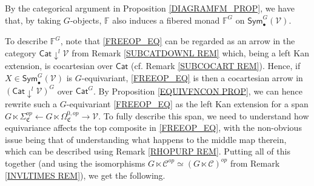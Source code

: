 \documentclass[a4paper,10pt
]{article}%
\numberwithin{equation}{section}
\numberwithin{figure}{section}
\theoremstyle{definition} %
\newcommand{\V}{\ensuremath{\mathcal V}}
\newcommand{\1}{\ensuremath{\mathbbm 1}}%
\begin{document}
By the categorical argument in 
Proposition \ref{DIAGRAMFM_PROP},
we have that, by taking $G$-objects, 
$\mathbb{F}$ also induces a fibered monad 
$\mathbb{F}^G$ on $\mathsf{Sym}^G_{\bullet}(\V)$.

To describe $\mathbb{F}^G$,
note that \eqref{FREEOP_EQ}
can be regarded as an arrow in 
the category $\mathsf{Cat} \downarrow^l \V$
from Remark \ref{SUBCATDOWNL REM}
which, being a left Kan extension, is cocartesian over $\mathsf{Cat}$ (cf. Remark \ref{SUBCOCART REM}).
Hence, if $X \in \mathsf{Sym}_{\bullet}^G(\V)$
is $G$-equivariant, 
\eqref{FREEOP_EQ} is then a cocartesian arrow in 
$\left(\mathsf{Cat} \downarrow^l \V\right)^G$
over $\mathsf{Cat}^G$.
By Proposition \ref{EQUIVFNCON PROP},
we can hence rewrite 
such a $G$-equivariant \eqref{FREEOP_EQ}
as the left Kan extension for a span
$G \ltimes \Sigma^{op}_{\mathfrak{C}}
\leftarrow 
G \ltimes \Omega^{0,op}_{\mathfrak{C}}
\to 
\V$.
To fully describe this span,
we need to understand how equivariance 
affects the top composite in \eqref{FREEOP_EQ},
with the non-obvious issue being that of understanding
what happens to the middle map
therein, which can be described using
Remark \ref{RHOPURP REM}.
Putting all of this together
(and using the isomorphisms
$G \ltimes \mathcal{C}^{op} \simeq (G \ltimes \mathcal{C})^{op}$
from Remark \ref{INVLTIMES REM}),
we get the following.
\end{document}

